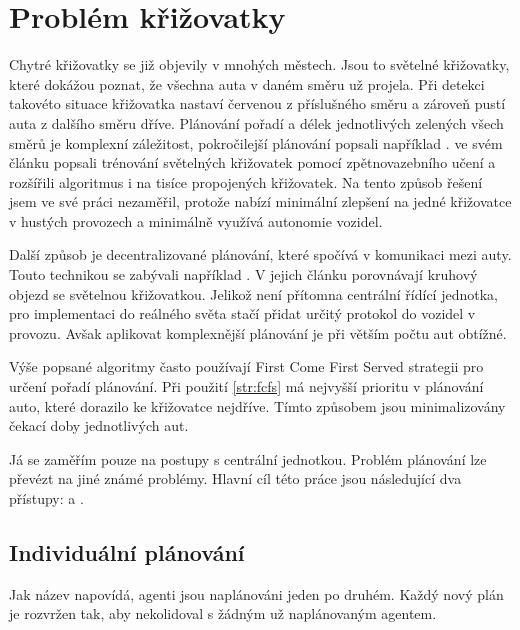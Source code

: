 \chapter{Problém křižovatky}\label{ch:problem}

Chytré křižovatky se již objevily v mnohých městech.
Jsou to světelné křižovatky, které dokážou poznat, že všechna auta v daném směru už projela.
Při detekci takovéto situace křižovatka nastaví červenou z příslušného směru a zároveň pustí auta z dalšího směru dříve.
Plánování pořadí a délek jednotlivých zelených všech směrů je komplexní záležitost, pokročilejší plánování popsali například \citet*{Goldstein}.
\citet*{Liang} ve svém článku popsali trénování světelných křižovatek pomocí zpětnovazebního učení a rozšířili algoritmus i na tisíce propojených křižovatek.
Na tento způsob řešení jsem ve své práci nezaměřil, protože nabízí minimální zlepšení na jedné křižovatce v hustých provozech a minimálně využívá autonomie vozidel.

Další způsob je decentralizované plánování, které spočívá v komunikaci mezi auty.
Touto technikou se zabývali například \citet*{Wu}.
V jejich článku porovnávají kruhový objezd se světelnou křižovatkou.
Jelikož není přítomna centrální řídící jednotka, pro implementaci do reálného světa stačí přidat určitý protokol do vozidel v provozu.
Avšak aplikovat komplexnější plánování je při větším počtu aut obtížné.

Výše popsané algoritmy často používají First Come First Served  strategii pro určení pořadí plánování.
Při použití \ref{str:fcfs} má nejvyšší prioritu v plánování auto, které dorazilo ke křižovatce nejdříve.
Tímto způsobem jsou minimalizovány čekací doby jednotlivých aut.

Já se zaměřím pouze na postupy s centrální jednotkou.
Problém plánování lze převézt na jiné známé problémy.
Hlavní cíl této práce jsou následující dva přístupy: \emph{} a \emph{}.


\section{Individuální plánování}\label{sec:individualni_planovani}

Jak název napovídá, agenti jsou naplánováni jeden po druhém.
Každý nový plán je rozvržen tak, aby nekolidoval s žádným už naplánovaným agentem.

